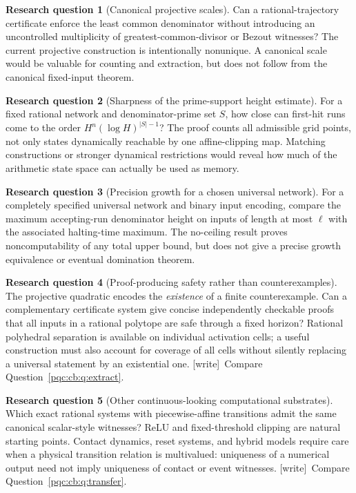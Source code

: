 \documentclass[11pt,letterpaper]{article}
\numberwithin{equation}{section}
\theoremstyle{definition}
\newtheorem{question}{Research question}
\theoremstyle{remark}
\newcommand{\wtag}{\textup{[write]}}
\begin{document}
\begin{question}[Canonical projective scales]
Can a rational-trajectory certificate enforce the least common denominator
without introducing an uncontrolled multiplicity of greatest-common-divisor
or Bezout witnesses? The current projective construction is intentionally
nonunique. A canonical scale would be valuable for counting and extraction,
but does not follow from the canonical fixed-input theorem.
\end{question}

\begin{question}[Sharpness of the prime-support height estimate]
For a fixed rational network and denominator-prime set $S$, how close can
first-hit runs come to the order
$H^n(\log H)^{|S|-1}$? The proof counts all admissible grid points, not only
states dynamically reachable by one affine-clipping map. Matching
constructions or stronger dynamical restrictions would reveal how much of
the arithmetic state space can actually be used as memory.
\end{question}

\begin{question}[Precision growth for a chosen universal network]
For a completely specified universal network and binary input encoding,
compare the maximum accepting-run denominator height on inputs of length
at most $\ell$ with the associated halting-time maximum. The no-ceiling
result proves noncomputability of any total upper bound, but does not give
a precise growth equivalence or eventual domination theorem.
\end{question}

\begin{question}[Proof-producing safety rather than counterexamples]
The projective quadratic encodes the \emph{existence} of a finite counterexample.
Can a complementary certificate system give concise independently checkable
proofs that all inputs in a rational polytope are safe through a fixed
horizon? Rational polyhedral separation is available on individual
activation cells; a useful construction must also account for coverage
of all cells without silently replacing a universal statement by an
existential one.
\wtag\ Compare Question~\ref{pqc:cb:q:extract}.
\end{question}

\begin{question}[Other continuous-looking computational substrates]
Which exact rational systems with piecewise-affine transitions admit the
same canonical scalar-style witnesses? ReLU and fixed-threshold clipping
are natural starting points. Contact dynamics, reset systems, and hybrid
models require care when a physical transition relation is multivalued:
uniqueness of a numerical output need not imply uniqueness of contact or
event witnesses.
\wtag\ Compare Question~\ref{pqc:cb:q:transfer}.
\end{question}
\end{document}
